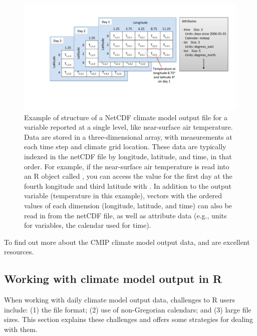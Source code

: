 \begin{figure}
\begin{center}
\includegraphics[width = \textwidth]{netcdf_figure}
\end{center}
\caption{Example of structure of a NetCDF climate model output file for a variable reported at a single level, like near-surface air temperature. Data are stored in a three-dimensional array, with measurements at each time step and climate grid location. These data are typically indexed in the netCDF file by longitude, latitude, and time, in that order. For example, if the near-surface air temperature is read into an R object called , you can access the value for the first day at the fourth longitude and third latitude with . In addition to the output variable (temperature in this example), vectors with the ordered values of each dimension (longitude, latitude, and time) can also be read in from the netCDF file, as well as attribute data (e.g., units for variables, the calendar used for time).}
\label{fig:netcdfexample}
\end{figure}

To find out more about the CMIP climate model output data,
\citet{taylor2012overview} and \citet{meehl2007wcrp} are excellent
resources.

\subsection{Working with climate model output in
R}\label{working-with-climate-model-output-in-r}

When working with daily climate model output data, challenges to R users
include: (1) the file format; (2) use of non-Gregorian calendars; and
(3) large file sizes. This section explains these challenges and offers
some strategies for dealing with them.

